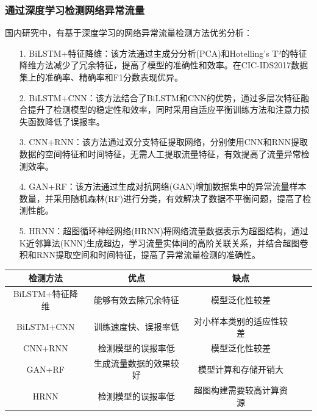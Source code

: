 \subsubsection{通过深度学习检测网络异常流量}
国内研究中，有基于深度学习的网络异常流量检测方法优劣分析\cite{yang2024network}：
\begin{itemize}
    \item[1.] BiLSTM+特征降维：该方法通过主成分分析(PCA)和Hotelling's T²的特征降维方法减少了冗余特征，提高了模型的准确性和效率。在CIC-IDS2017数据集上的准确率、精确率和F1分数表现优异。
    \item[2.] BiLSTM+CNN：该方法结合了BiLSTM和CNN的优势，通过多层次特征融合提升了检测模型的稳定性和效率，同时采用自适应平衡训练方法和注意力损失函数降低了误报率。
    \item[3.] CNN+RNN：该方法通过双分支特征提取网络，分别使用CNN和RNN提取数据的空间特征和时间特征，无需人工提取流量特征，有效提高了流量异常检测效率。
    \item[4.] GAN+RF：该方法通过生成对抗网络(GAN)增加数据集中的异常流量样本数量，并采用随机森林(RF)进行分类，有效解决了数据不平衡问题，提高了检测性能。
    \item[5.] HRNN：超图循环神经网络(HRNN)将网络流量数据表示为超图结构，通过K近邻算法(KNN)生成超边，学习流量实体间的高阶关联关系，并结合超图卷积和RNN提取空间和时间特征，提高了异常流量检测的准确性。
\end{itemize}

\begin{table}[htbp]
    \vspace{0.5em}\centering\wuhao
    \begin{tabular}{ccccc}
        \toprule
        检测方法        & 优点          & 缺点           \\
        \midrule
        BiLSTM+特征降维 & 能够有效去除冗余特征  & 模型泛化性较差      \\
        BiLSTM+CNN  & 训练速度快、误报率低  & 对小样本类别的适应性较差 \\
        CNN+RNN     & 检测模型的误报率低   & 模型泛化性较差      \\
        GAN+RF      & 生成流量数据的效果较好 & 模型计算和存储开销大   \\
        HRNN        & 检测模型的误报率低   & 超图构建需要较高计算资源 \\
        \bottomrule
    \end{tabular}
\end{table}
